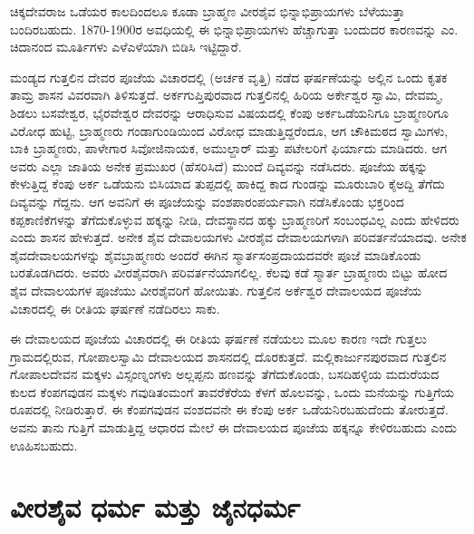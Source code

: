 ಚಿಕ್ಕದೇವರಾಜ ಒಡೆಯರ ಕಾಲದಿಂದಲೂ ಕೂಡಾ ಬ್ರಾಹ್ಮಣ ವೀರಶೈವ ಭಿನ್ನಾಭಿಪ್ರಾಯಗಳು ಬೆಳೆಯುತ್ತಾ ಬಂದಿರಬಹುದು. 1870-1900ರ ಅವಧಿಯಲ್ಲಿ ಈ ಭಿನ್ನಾಭಿಪ್ರಾಯಗಳು ಹೆಚ್ಚಾಗುತ್ತಾ ಬಂದುದರ ಕಾರಣವನ್ನು ಎಂ. ಚಿದಾನಂದ ಮೂರ್ತಿಗಳು ಎಳೆಎಳೆಯಾಗಿ ಬಿಡಿಸಿ ಇಟ್ಟಿದ್ದಾರೆ.

ಮಂಡ್ಯದ ಗುತ್ತಲಿನ ದೇವರ ಪೂಜೆಯ ವಿಚಾರದಲ್ಲಿ (ಅರ್ಚಕ ವೃತ್ತಿ) ನಡೆದ ಘರ್ಷಣೆಯನ್ನು ಅಲ್ಲಿನ ಒಂದು ಕೃತಕ ತಾಮ್ರ ಶಾಸನ ವಿವರವಾಗಿ ತಿಳಿಸುತ್ತದೆ. ಅರ್ಕಗುಪ್ತಿಪುರವಾದ ಗುತ್ತಲಿನಲ್ಲಿ ಹಿರಿಯ ಅರ್ಕೇಶ್ವರ ಸ್ವಾಮಿ, ದೇವಮ್ಮ, ಶಿಡಲು ಬಸವೇಶ್ವರ, ಭೈರವೇಶ್ವರ ದೇವರನ್ನು ಆರಾಧಿಸುವ ವಿಷಯದಲ್ಲಿ ಕೆಂಪು ಅರ್ಕಒಡೆಯನಿಗೂ ಬ್ರಾಹ್ಮಣರಿಗೂ ವಿರೋಧ ಹುಟ್ಟಿ, ಬ್ರಾಹ್ಮಣರು ಗಂಡಾಗುಂಡಿಯಿಂದ ವಿರೋಧ ಮಾಡುತ್ತಿದ್ದರೆಂದೂ, ಆಗ ಚೌಕಿಮಠದ ಸ್ವಾಮಿಗಳು, ಬಾಕಿ ಬ್ರಾಹ್ಮಣರು, ಪಾಳೇಗಾರ ಸಿವೋಜಿನಾಯಕ, ಅಮುಲ್ದಾರ್​ ಮತ್ತು ಪಟೇಲರಿಗೆ ಫಿರ್ಯಾದು ಮಾಡಿದರು. ಆಗ ಅವರು ಎಲ್ಲಾ ಜಾತಿಯ ಅನೇಕ ಪ್ರಮುಖರ (ಹೆಸರಿಸಿದೆ) ಮುಂದೆ ದಿವ್ಯವನ್ನು ನಡೆಸಿದರು. ಪೂಜೆಯ ಹಕ್ಕನ್ನು ಕೇಳುತ್ತಿದ್ದ ಕೆಂಪು ಅರ್ಕ ಒಡೆಯನು ಬಿಸಿಯಾದ ತುಪ್ಪದಲ್ಲಿ ಹಾಕಿದ್ದ ಕಾದ ಗುಂಡನ್ನು ಮೂರುಬಾರಿ ಕೈಅದ್ದಿ ತೆಗೆದು ದಿವ್ಯವನ್ನು ಗೆದ್ದನು. ಆಗ ಅವನಿಗೆ ಈ ಪೂಜೆಯನ್ನು ವಂಶಪಾರಂಪರ್ಯವಾಗಿ ನಡೆಸಿಕೊಂಡು ಭಕ್ತರಿಂದ ಕಪ್ಪಕಾಣಿಕೆಗಳನ್ನು ತೆಗೆದುಕೊಳ್ಳುವ ಹಕ್ಕನ್ನು ನೀಡಿ, ದೇವಸ್ಥಾನದ ಹಕ್ಕು ಬ್ರಾಹ್ಮಣರಿಗೆ ಸಂಬಂಧವಿಲ್ಲ ಎಂದು ಹೇಳಿದರು ಎಂದು ಶಾಸನ ಹೇಳುತ್ತದೆ. ಅನೇಕ ಶೈವ ದೇವಾಲಯಗಳು ವೀರಶೈವ ದೇವಾಲಯಗಳಾಗಿ ಪರಿವರ್ತನೆಯಾದವು. ಅನೇಕ ಶೈವದೇವಾಲಯಗಳನ್ನು ಶೈವಬ್ರಾಹ್ಮಣರು ಅಂದರೆ ಈಗಿನ ಸ್ಮಾರ್ತಸಂಪ್ರದಾಯದವರೇ ಪೂಜೆ ಮಾಡಿಕೊಂಡು ಬರತೊಡಗಿದರು. ಅವರು ವೀರಶೈವರಾಗಿ ಪರಿವರ್ತನೆಯಾಗಲಿಲ್ಲ. ಕೆಲವು ಕಡೆ ಸ್ಮಾರ್ತ ಬ್ರಾಹ್ಮಣರು ಬಿಟ್ಟು ಹೋದ ಶೈವ ದೇವಾಲಯಗಳ ಪೂಜೆಯು ವೀರಶೈವರಿಗೆ ಹೋಯಿತು. ಗುತ್ತಲಿನ ಅರ್ಕೆಶ್ವರ ದೇವಾಲಯದ ಪೂಜೆಯ ವಿಚಾರದಲ್ಲಿ ಈ ರೀತಿಯ ಘರ್ಷಣೆ ನಡೆದಿರಲು ಸಾಕು.

\vskip -2pt

ಈ ದೇವಾಲಯದ ಪೂಜೆಯ ವಿಚಾರದಲ್ಲಿ ಈ ರೀತಿಯ ಘರ್ಷಣೆ ನಡೆಯಲು ಮೂಲ ಕಾರಣ ಇದೇ ಗುತ್ತಲು ಗ್ರಾಮದಲ್ಲಿರುವ, ಗೋಪಾಲಸ್ವಾಮಿ ದೇವಾಲಯದ ಶಾಸನದಲ್ಲಿ ದೊರಕುತ್ತದೆ. ಮಲ್ಲಿಕಾರ್ಜುನಪುರವಾದ ಗುತ್ತಲಿನ ಗೋಪಾಲದೇವನ ಮಕ್ಕಳು ವಿಸ್ಸಂಣ್ನಂಗಳು ಅಲ್ಲಪ್ಪನು ಹಣವನ್ನು ತೆಗೆದುಕೊಂಡು, ಬಸದಿಹಳ್ಳಿಯ ಮದುರೆಯದ ಕುಲದ ಕೆಂಪಗವುಡನ ಮಕ್ಕಳು ಗವುಡಿತಂಮಂಗೆ ತಾವರೆಕೆರೆಯ ಕೆಳಗೆ ಹೊಲವನ್ನು, ಒಂದು ಮನೆಯನ್ನು ಗುತ್ತಿಗೆಯ ರೂಪದಲ್ಲಿ ನೀಡಿರುತ್ತಾರೆ. ಈ ಕೆಂಪಗವುಡನ ವಂಶದವನೇ ಈ ಕೆಂಪು ಅರ್ಕ ಒಡೆಯನಿರಬಹುದೆಂದು ತೋರುತ್ತದೆ. ಅವನು ತಾನು ಗುತ್ತಿಗೆ ಮಾಡುತ್ತಿದ್ದ ಆಧಾರದ ಮೇಲೆ ಈ ದೇವಾಲಯದ ಪೂಜೆಯ ಹಕ್ಕನ್ನೂ ಕೇಳಿರಬಹುದು ಎಂದು ಊಹಿಸಬಹುದು.

\vskip -2pt

\section*{ವೀರಶೈವ ಧರ್ಮ ಮತ್ತು ಜೈನಧರ್ಮ}


